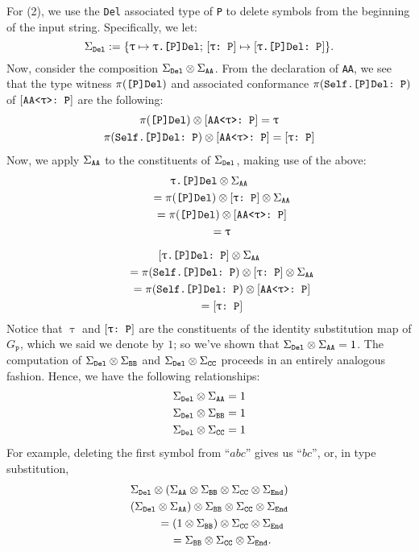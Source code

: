\documentclass[../generics]{subfiles}
\begin{document}
For (2), we use the \texttt{Del} associated type of \texttt{P} to delete symbols from the beginning of the input string. Specifically, we let:
\[
\Sigma_{\texttt{Del}} := \{\texttt{$\uptau$} \mapsto \texttt{$\uptau$.[P]Del};\,[\texttt{$\uptau$:~P}] \mapsto [\texttt{$\uptau$.[P]Del:~P}]\}.
\]
Now, consider the composition $\Sigma_{\texttt{Del}}\otimes\Sigma_{\texttt{AA}}$. From the declaration of \texttt{AA}, we see that the type witness $\pi(\texttt{[P]Del})$ and associated conformance $\pi(\texttt{Self.[P]Del:~P})$ of $[\texttt{AA<$\uptau$>:~P}]$ are the following:
\begin{gather*}
\pi(\texttt{[P]Del})\otimes[\texttt{AA<$\uptau$>:~P}]=\uptau\\
\pi(\texttt{Self.[P]Del:~P})\otimes[\texttt{AA<$\uptau$>:~P}]=[\texttt{$\uptau$:~P}]
\end{gather*}
Now, we apply $\Sigma_{\texttt{AA}}$ to the constituents of $\Sigma_{\texttt{Del}}$, making use of the above:
\begin{gather*}
\texttt{$\uptau$.[P]Del} \otimes \Sigma_{\texttt{AA}}\\
\qquad {} = \pi(\texttt{[P]Del}) \otimes [\texttt{$\uptau$:~P}] \otimes \Sigma_{\texttt{AA}}\\
\qquad {} = \pi(\texttt{[P]Del}) \otimes [\texttt{AA<$\uptau$>:~P}]\\
\qquad {} = \uptau\\[\medskipamount]
[\texttt{$\uptau$.[P]Del:~P}] \otimes \Sigma_{\texttt{AA}}\\
\qquad {} = \pi(\texttt{Self.[P]Del:~P}) \otimes [\texttt{$\uptau$:~P}] \otimes \Sigma_{\texttt{AA}}\\
\qquad {} = \pi(\texttt{Self.[P]Del:~P}) \otimes [\texttt{AA<$\uptau$>:~P}]\\
\qquad {} = [\texttt{$\uptau$:~P}]
\end{gather*}
Notice that $\uptau$ and $[\texttt{$\uptau$:~P}]$ are the constituents of the identity substitution map of $G_\texttt{P}$, which we said we denote by $1$; so we've shown that $\Sigma_{\texttt{Del}}\otimes\Sigma_{\texttt{AA}}=1$. The computation of $\Sigma_{\texttt{Del}}\otimes\Sigma_{\texttt{BB}}$ and $\Sigma_{\texttt{Del}}\otimes\Sigma_{\texttt{CC}}$ proceeds in an entirely analogous fashion. Hence, we have the following relationships:
\begin{gather*}
\Sigma_{\texttt{Del}}\otimes\Sigma_{\texttt{AA}} = 1\\
\Sigma_{\texttt{Del}}\otimes\Sigma_{\texttt{BB}} = 1\\
\Sigma_{\texttt{Del}}\otimes\Sigma_{\texttt{CC}} = 1
\end{gather*}
For example, deleting the first symbol from ``$abc$'' gives us ``$bc$'', or, in type substitution,
\begin{gather*}
\Sigma_{\texttt{Del}}\otimes\left(\Sigma_{\texttt{AA}}\otimes\Sigma_{\texttt{BB}}\otimes\Sigma_{\texttt{CC}}\otimes\Sigma_{\texttt{End}}\right)\\
\left(\Sigma_{\texttt{Del}}\otimes\Sigma_{\texttt{AA}}\right)\otimes\Sigma_{\texttt{BB}}\otimes\Sigma_{\texttt{CC}}\otimes\Sigma_{\texttt{End}}\\
\qquad {} =\left(1\otimes\Sigma_{\texttt{BB}}\right)\otimes\Sigma_{\texttt{CC}}\otimes\Sigma_{\texttt{End}}\\
\qquad {} =\Sigma_{\texttt{BB}}\otimes\Sigma_{\texttt{CC}}\otimes\Sigma_{\texttt{End}}.
\end{gather*}
\end{document}
